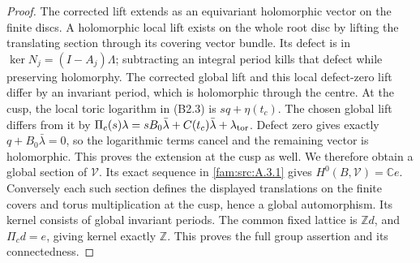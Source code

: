 \begin{proof}
The corrected lift extends as an equivariant holomorphic vector on the finite discs. A holomorphic local lift exists on the whole root disc by lifting the translating section through its covering vector bundle. Its defect is in $\ker N_j=(I-A_j)\Lambda$; subtracting an integral period kills that defect while preserving holomorphy. The corrected global lift and this local defect-zero lift differ by an invariant period, which is holomorphic through the centre. At the cusp, the local toric logarithm in (B2.3) is $sq+\eta(t_c)$. The chosen global lift differs from it by $\Pi_c(s)\lambda=sB_0\bar\lambda+C(t_c)\bar\lambda+\lambda_{\rm tor}$. Defect zero gives exactly $q+B_0\bar\lambda=0$, so the logarithmic terms cancel and the remaining vector is holomorphic. This proves the extension at the cusp as well. We therefore obtain a global section of $\mathcal V$. Its exact sequence in \ref{fam:src:A.3.1} gives $H^0(B,\mathcal V)=\mathbb Ce$. Conversely each such section defines the displayed translations on the finite covers and torus multiplication at the cusp, hence a global automorphism. Its kernel consists of global invariant periods. The common fixed lattice is $\mathbb Zd$, and $\Pi_cd=e$, giving kernel exactly $\mathbb Z$. This proves the full group assertion and its connectedness.
\end{proof}

